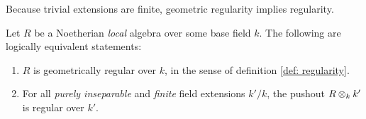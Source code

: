                 \begin{remark}
                    Because trivial extensions are finite, geometric regularity implies regularity.
                \end{remark}
                
                \begin{proposition} \label{two_equivalent_defs_geometric_regularity} 
                    Let $R$ be a Noetherian \textit{local} algebra over some base field $k$. The following are logically equivalent statements:
                        \begin{enumerate}
                            \item $R$ is geometrically regular over $k$, in the sense of definition \ref{def: regularity}.
                            \item For all \textit{purely inseparable} and \textit{finite} field extensions $k'/k$, the pushout $R \tensor_k k'$ is regular over $k'$. 
                        \end{enumerate}
                \end{proposition}
